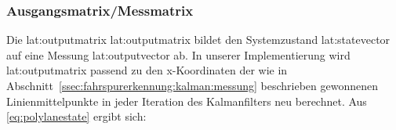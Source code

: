 
\subsubsection{Ausgangsmatrix/Messmatrix} 
\label{sssec:fahrspurerkennung:kalman-filter:zustandsraumbeschreibung:outputmatrix}
Die \glsdesc{lat:outputmatrix} \gls{lat:outputmatrix} bildet den Systemzustand \gls{lat:statevector} auf eine Messung \gls{lat:outputvector} ab. In unserer Implementierung wird  \gls{lat:outputmatrix} passend zu den \gls{x}-Koordinaten der wie in Abschnitt~\ref{ssec:fahrspurerkennung:kalman:messung} beschrieben gewonnenen Linienmittelpunkte in jeder Iteration des Kalmanfilters neu berechnet. Aus \eqref{eq:polylanestate} ergibt sich:
